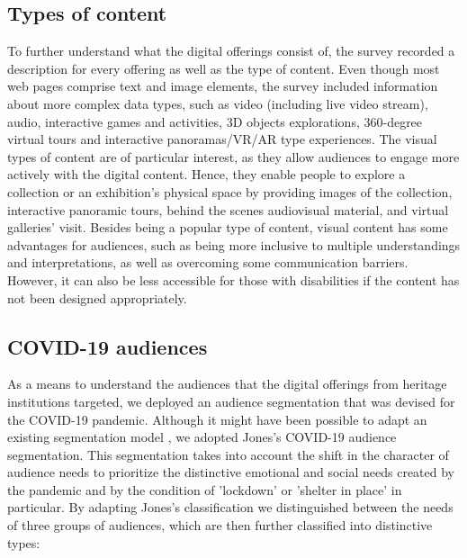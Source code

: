 \documentclass{egpubl}
\begin{document}
\subsection{Types of content}
\label{typ}
To further understand what the digital offerings consist of, the survey recorded a description for every offering as well as the type of content. Even though most web pages comprise text and image elements, the survey included information about more complex data types, such as video (including live video stream), audio, interactive games and activities, 3D objects explorations, 360-degree virtual tours and interactive panoramas/VR/AR type experiences.
The visual types of content are of particular interest, as they allow audiences to engage more actively with the digital content. Hence, they enable people to explore a collection or an exhibition's physical space by providing images of the collection, interactive panoramic tours, behind the scenes audiovisual material, and virtual galleries' visit. Besides being a popular type of content, visual content has some advantages for audiences, such as being more inclusive to multiple understandings and interpretations, as well as overcoming some communication barriers. However, it can also be less accessible for those with disabilities if the content has not been designed appropriately.

\subsection{COVID-19 audiences}
\label{covaud}
As a means to understand the audiences that the digital offerings from heritage institutions targeted, we deployed an audience segmentation that was devised for the COVID-19 pandemic. Although it might have been possible to adapt an existing segmentation model \cite{Drot19}, we adopted Jones's \cite{Audiences2020} COVID-19 audience segmentation. This segmentation takes into account the shift in the character of audience needs to prioritize the distinctive emotional and social needs created by the pandemic and by the condition of 'lockdown' or 'shelter in place' in particular. By adapting Jones's classification we distinguished between the needs of three groups of audiences, which are then further classified into distinctive types: 
\end{document}
